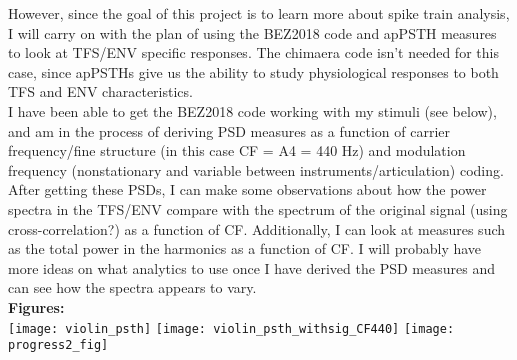 \documentclass[9pt]{extarticle}
\begin{document}
However, since the goal of this project is to learn more about spike train analysis, I will carry on with the plan of using the BEZ2018 code and apPSTH measures to look at TFS/ENV specific responses. The chimaera code isn't needed for this case, since apPSTHs give us the ability to study physiological responses to both TFS and ENV characteristics.  \\

I have been able to get the BEZ2018 code working with my stimuli (see below), and am in the process of deriving PSD measures as a function of carrier frequency/fine structure (in this case CF = A4 = 440 Hz) and modulation frequency (nonstationary and variable between instruments/articulation) coding. After getting these PSDs, I can make some observations about how the power spectra in the TFS/ENV compare with the spectrum of the original signal (using cross-correlation?) as a function of CF. Additionally, I can look at measures such as the total power in the harmonics as a function of CF. I will probably have more ideas on what analytics to use once I have derived the PSD measures and can see how the spectra appears to vary. \\

\textbf{Figures:}\\

\centering
\texttt{[image: violin\_psth]}
\texttt{[image: violin\_psth\_withsig\_CF440]}
\texttt{[image: progress2\_fig]}
\end{document}
